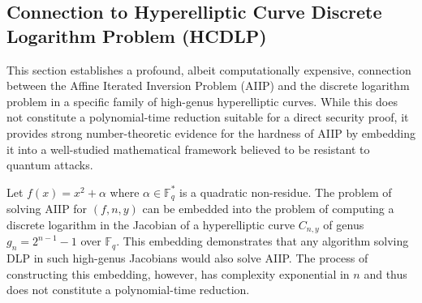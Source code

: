 \subsection{Connection to Hyperelliptic Curve Discrete Logarithm Problem (HCDLP)}\label{subsec:hcdlp-connection}
            This section establishes a profound, albeit computationally expensive, connection between the Affine Iterated Inversion Problem (AIIP) and the discrete logarithm problem in a specific family of high-genus hyperelliptic curves. While this does not constitute a polynomial-time reduction suitable for a direct security proof, it provides strong number-theoretic evidence for the hardness of AIIP by embedding it into a well-studied mathematical framework believed to be resistant to quantum attacks.
            \begin{theorem}\label{thm:aiip-hcdlp-connection}
                Let \( f(x) = x^2 + \alpha \) where \( \alpha \in \mathbb{F}_q^* \) is a quadratic non-residue. The problem of solving AIIP for \( (f, n, y) \) can be embedded into the problem of computing a discrete logarithm in the Jacobian of a hyperelliptic curve \( C_{n,y} \) of genus \( g_n = 2^{n-1} - 1 \) over \( \mathbb{F}_q \). This embedding demonstrates that any algorithm solving DLP in such high-genus Jacobians would also solve AIIP. The process of constructing this embedding, however, has complexity exponential in \( n \) and thus does not constitute a polynomial-time reduction.
            \end{theorem}
